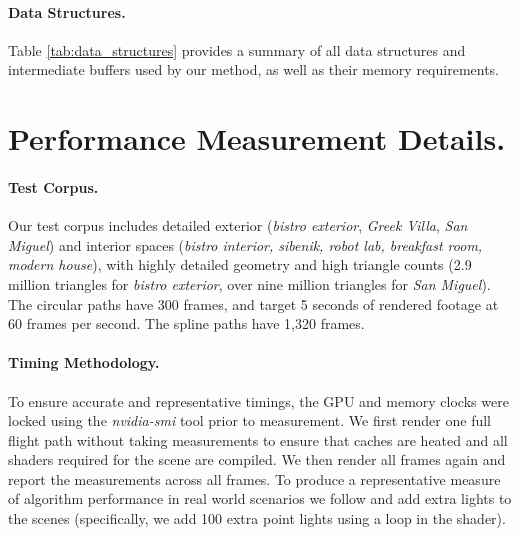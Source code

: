 

\paragraph*{Data Structures.} Table \ref{tab:data_structures} provides a summary of all data structures and intermediate buffers used by our method, as well as their memory requirements.



\section{Performance Measurement Details.}

\paragraph*{Test Corpus.} Our test corpus includes detailed exterior (\textit{bistro exterior}, \textit{Greek Villa}, \textit{San Miguel}) and interior spaces (\textit{bistro interior, sibenik, robot lab, breakfast room, modern house}), with highly detailed geometry and high triangle counts (2.9 million triangles for \textit{bistro exterior}, over nine million triangles for {\em San Miguel}). The circular paths have 300 frames, and target 5 seconds of rendered footage at 60 frames per second. The spline paths have 1,320 frames.

\paragraph*{Timing Methodology.} To ensure accurate and representative timings, the GPU and memory clocks were locked using the {\em nvidia-smi} tool prior to measurement. We first render one full flight path without taking measurements to ensure that caches are heated and all shaders required for the scene are compiled. We then render all frames again and report the measurements across all frames. To produce a representative measure of algorithm performance in real world scenarios we follow \cite{Neff2022MSA} and add extra lights to the scenes (specifically, we add 100 extra point lights using a loop in the shader). 

